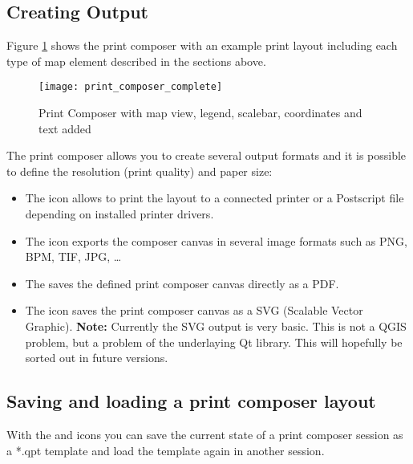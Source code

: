 \subsection{Creating Output}

Figure \ref{fig:print_composer_complete} shows the print composer with an example 
print layout including each type of map element described in the sections above.

\begin{figure}[h]
   \begin{center}
   \caption{Print Composer with map view, legend, scalebar, coordinates and text added \nixcaption}
   \label{fig:print_composer_complete}\smallskip
   \texttt{[image: print\_composer\_complete]}
\end{center}  
\end{figure}

The print composer allows you to create several output formats and it is possible to 
define the resolution (print quality) and paper size:

\begin{itemize}
\item The  icon allows to print the layout 
to a connected printer or a Postscript file depending on installed printer 
drivers.
\item The  icon exports the 
composer canvas in several image formats such as PNG, BPM, TIF, JPG, \dots
\item The  saves the defined
print composer canvas directly as a PDF.
\item The  icon saves the print 
composer canvas as a SVG (Scalable Vector Graphic). \textbf{Note:} Currently the 
SVG output is very basic. This is not a QGIS problem, but a problem of the underlaying 
Qt library. This will hopefully be sorted out in future versions.
\end{itemize}

\subsection{Saving and loading a print composer layout}

With the  and
 icons you can save the current
state of a print composer session as a  *.qpt template and load the template
again in another session.

